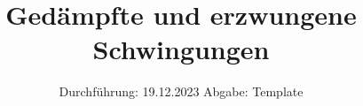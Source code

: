 

\subject{v354}
\title{Gedämpfte und erzwungene Schwingungen}
\date{%
  Durchführung: 19.12.2023
  \hspace{3em}
  Abgabe: Template
}



\maketitle
\thispagestyle{empty}
\tableofcontents
\newpage






\printbibliography{}


